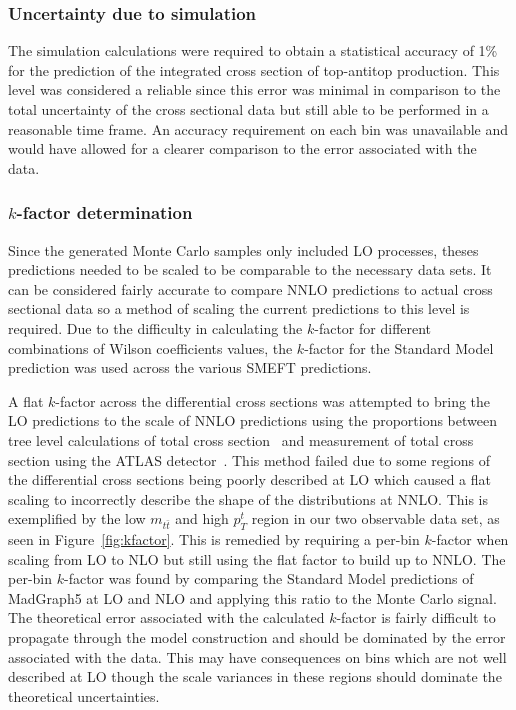 \documentclass[a4paper,11pt]{article}
\begin{document}
\subsubsection{Uncertainty due to simulation}

The simulation calculations were required to obtain a statistical accuracy of 1\% for the prediction of the integrated cross section of top-antitop production.
This level was considered a reliable since this error was minimal in comparison to the total uncertainty of the cross sectional data but still able to be performed in a reasonable time frame.
An accuracy requirement on each bin was unavailable and would have allowed for a clearer comparison to the error associated with the data.

\subsubsection{\texorpdfstring{$k$}{k}-factor determination}
Since the generated Monte Carlo samples only included LO processes, theses predictions needed to be scaled to be comparable to the necessary data sets.
It can be considered fairly accurate to compare NNLO predictions to actual cross sectional data so a method of scaling the current predictions to this level is required.
Due to the difficulty in calculating the $k$-factor for different combinations of Wilson coefficients values, the $k$-factor for the Standard Model prediction was used across the various SMEFT predictions.

A flat $k$-factor across the differential cross sections was attempted to bring the LO predictions to the scale of NNLO predictions using the proportions between tree level calculations of total cross section~\cite{Alwall_2014} and measurement of total cross section using the ATLAS detector~\cite{ATLAS:2019hxz}.
This method failed due to some regions of the differential cross sections being poorly described at LO which caused a flat scaling to incorrectly describe the shape of the distributions at NNLO.
This is exemplified by the low $m_{t\bar{t}}$ and high $p_{T}^{t}$ region in our two observable data set, as seen in Figure~\ref{fig:kfactor}.
This is remedied by requiring a per-bin $k$-factor when scaling from LO to NLO but still using the flat factor to build up to NNLO.
The per-bin $k$-factor was found by comparing the Standard Model predictions of MadGraph5 at LO and NLO and applying this ratio to the Monte Carlo signal.
The theoretical error associated with the calculated $k$-factor is fairly difficult to propagate through the model construction and should be dominated by the error associated with the data.
This may have consequences on bins which are not well described at LO though the scale variances in these regions should dominate the theoretical uncertainties.
\end{document}
